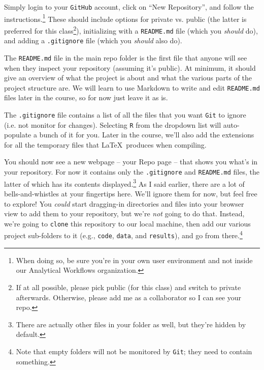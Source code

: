 \documentclass[12pt,letterpaper]{article}
\begin{document}
Simply login to your \texttt{GitHub} account, click on ``New Repository'', and 
follow the instructions.\footnote{When doing so, be sure you're in your own user 
environment and not inside our Analytical Workflows organization.}
These should include options for private vs. public (the latter is preferred for this class\footnote{If at all possible, please pick public (for this class) and switch to private afterwards.  Otherwise, please add me as a collaborator so I can see your repo.}), initializing with a \texttt{README.md} file (which you \emph{should} do), and adding a \texttt{.gitignore} file (which you \emph{should} also do).

The \texttt{README.md} file in the main repo folder is the first file that anyone will see when they inspect your repository (assuming it's public).
At minimum, it should give an overview of what the project is about and what the various parts of the project structure are.
We will learn to use Markdown to write and edit \texttt{README.md} files later in the course, so for now just leave it as is.

The \texttt{.gitignore} file contains a list of all the files that you want \texttt{Git} to ignore (i.e. not monitor for changes).
Selecting \texttt{R} from the dropdown list will auto-populate a bunch of it for you.
Later in the course, we'll also add the extensions for all the temporary files that \LaTeX\ produces when compiling.

You should now see a new webpage -- your Repo page -- that shows you what's in your repository.
For now it contains only the \texttt{.gitignore} and \texttt{README.md} files, the 
latter of which has its contents displayed.\footnote{There are actually other files 
in your folder as well, but they're hidden by default.}
As I said earlier, there are a lot of bells-and-whistles at your fingertips here.
We'll ignore them for now, but feel free to explore!
You \emph{could} start dragging-in directories and files into your browser view 
to add them to your repository, but we're \emph{not} going to do that.
Instead, we're going to \texttt{clone} this repository to our local machine, then add our various project sub-folders to it (e.g., \texttt{code}, \texttt{data}, and \texttt{results}), and go from there.\footnote{Note that empty folders will not be monitored by \texttt{Git}; they need to contain something.}
\end{document}
